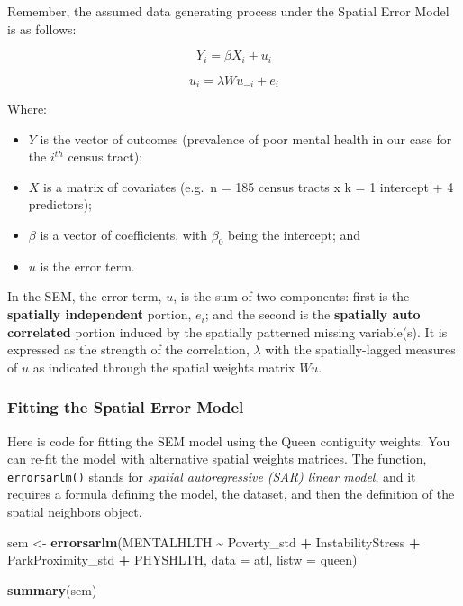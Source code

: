 \documentclass[
]{book}
\newenvironment{Shaded}{\begin{snugshade}}{\end{snugshade}}
\newcommand{\AttributeTok}[1]{\textcolor[rgb]{0.13,0.29,0.53}{#1}}
\newcommand{\FunctionTok}[1]{\textcolor[rgb]{0.13,0.29,0.53}{\textbf{#1}}}
\newcommand{\NormalTok}[1]{#1}
\newcommand{\OtherTok}[1]{\textcolor[rgb]{0.56,0.35,0.01}{#1}}
\newcommand{\SpecialCharTok}[1]{\textcolor[rgb]{0.81,0.36,0.00}{\textbf{#1}}}
\providecommand{\tightlist}{%
  \setlength{\itemsep}{0pt}\setlength{\parskip}{0pt}}
\begin{document}
Remember, the assumed data generating process under the Spatial Error Model is as follows:

\[Y_i=\beta X_i+u_i\]

\[u_i=\lambda Wu_{-i}+e_i\]

Where:

\begin{itemize}
\tightlist
\item
  \(Y\) is the vector of outcomes (prevalence of poor mental health in our case for the \(i^{th}\) census tract);
\item
  \(X\) is a matrix of covariates (e.g.~n = 185 census tracts x k = 1 intercept + 4 predictors);
\item
  \(\beta\) is a vector of coefficients, with \(\beta_0\) being the intercept; and
\item
  \(u\) is the error term.
\end{itemize}

In the SEM, the error term, \(u\), is the sum of two components: first is the \textbf{spatially independent} portion, \(e_i\); and the second is the \textbf{spatially auto correlated} portion induced by the spatially patterned missing variable(s). It is expressed as the strength of the correlation, \(\lambda\) with the spatially-lagged measures of \(u\) as indicated through the spatial weights matrix \(Wu\).

\hypertarget{fitting-the-spatial-error-model}{%
\subsubsection{Fitting the Spatial Error Model}\label{fitting-the-spatial-error-model}}

Here is code for fitting the SEM model using the Queen contiguity weights. You can re-fit the model with alternative spatial weights matrices. The function, \texttt{errorsarlm()} stands for \emph{spatial autoregressive (SAR) linear model}, and it requires a formula defining the model, the dataset, and then the definition of the spatial neighbors object.

\begin{Shaded}
\begin{Highlighting}[]
\NormalTok{sem }\OtherTok{\textless{}{-}} \FunctionTok{errorsarlm}\NormalTok{(MENTALHLTH }\SpecialCharTok{\textasciitilde{}}\NormalTok{ Poverty\_std }\SpecialCharTok{+}\NormalTok{ InstabilityStress }\SpecialCharTok{+}\NormalTok{ ParkProximity\_std  }\SpecialCharTok{+}\NormalTok{ PHYSHLTH,}
                  \AttributeTok{data =}\NormalTok{ atl,}
                  \AttributeTok{listw =}\NormalTok{ queen)}

\FunctionTok{summary}\NormalTok{(sem)}
\end{Highlighting}
\end{Shaded}
\end{document}
